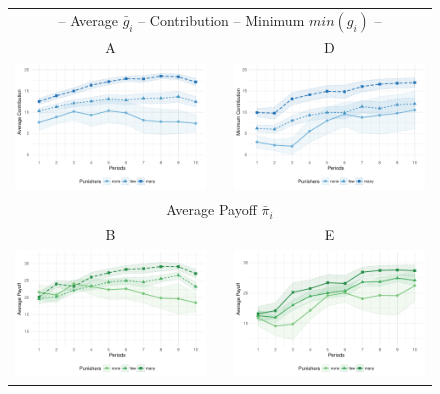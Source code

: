 \documentclass[11pt,a4paper]{article}
\begin{document}
\begin{refsection}
\begin{figure}[p]
  \centering
  \begin{tabular}{|c p{2ex} c|}
    \hline
    \multicolumn{3}{|c|}{\hspace{6ex}-- Average $\bar{g}_i$ --\hspace{10ex} Contribution \hspace{8ex}-- Minimum $min(g_i)$ --} \\
    A&&D\\
    [.5em]
    \includegraphics[width=.45\linewidth]{img/21_contrib}
     &&
    \includegraphics[width=.45\linewidth]{img/71_minimum}
        \\
    \hline
    \hline
    \multicolumn{3}{|c|}{Average Payoff $\bar{\pi}_i$}\\
    B&&E\\
    [.5em]
    \includegraphics[width=.45\linewidth]{img/21_payoff}
     &&
    \includegraphics[width=.45\linewidth]{img/71_payoff}

\end{tabular}
\end{figure}
\end{refsection}
\end{document}
